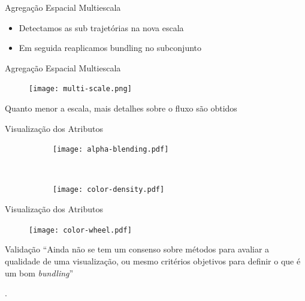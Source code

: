 \begin{frame}{Agregação Espacial Multiescala}
  \begin{itemize}
    \item Detectamos as sub trajetórias na nova escala
    \item Em seguida reaplicamos bundling no subconjunto
  \end{itemize}
\end{frame}

\begin{frame}{Agregação Espacial Multiescala}
	\begin{figure}[!htb]
		\centering
		\texttt{[image: multi-scale.png]}
	\end{figure}
	\centering
  Quanto menor a escala, mais detalhes sobre o fluxo são obtidos
\end{frame}

\begin{frame}{Visualização dos Atributos}
	\begin{figure}[ht!]
		\centering
		\begin{subfigure}[t]{\textwidth}
			\centering
			\texttt{[image: alpha-blending.pdf]}
		\end{subfigure}
		~
		\begin{subfigure}[t]{\textwidth}
			\centering
			\texttt{[image: color-density.pdf]}
		\end{subfigure}
	\end{figure}
\end{frame}

\begin{frame}{Visualização dos Atributos}
	\begin{figure}[ht!]
		\centering
		\texttt{[image: color-wheel.pdf]}
	\end{figure}
\end{frame}

\begin{frame}{Validação}
	\centering
 ``Ainda não se tem um consenso sobre métodos para avaliar a
qualidade de uma visualização, ou mesmo critérios objetivos para definir o
que é um bom \emph{bundling}''

	\hfill \citep{Lhuillier2017}.
\end{frame}

